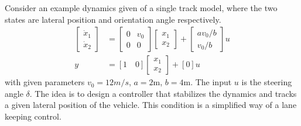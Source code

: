 Consider an example dynamics given of a single track model, where the two states are lateral position and orientation angle respectively.
\begin{align}
	\begin{bmatrix}
		\dot{x}_1 \\ \dot{x}_2
	\end{bmatrix} &= \begin{bmatrix}
		0 & v_0 \\ 0 & 0
	\end{bmatrix} \begin{bmatrix}
	{x}_1 \\ {x}_2
	\end{bmatrix} + \begin{bmatrix}
	a v_0/b \\ v_0 / b
	\end{bmatrix} u \label{Eq_StSp_Ex_DynamicsEq} \\
	y &= [1 \quad 0] \begin{bmatrix}
	{x}_1 \\ {x}_2 \end{bmatrix} + [0] u
\end{align}
with given parameters $v_0 = 12 m/s$, $a = 2$m, $b = 4$m. The input $u$ is the steering angle $\delta$. The idea is to design a controller that stabilizes the dynamics and tracks a given lateral position of the vehicle. This condition is a simplified way of a lane keeping control.

